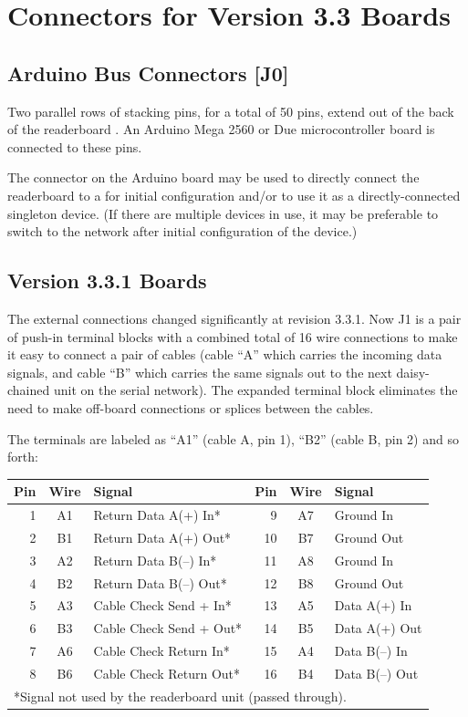 \section{Connectors for Version 3.3 Boards}
\subsection{Arduino Bus Connectors [J0]}
Two parallel rows of stacking pins, for a total of 50 pins, extend out of the back of the readerboard .
An Arduino Mega 2560 or Due microcontroller board is connected to these pins.

The  connector on the Arduino board may be used to directly connect the readerboard to a 
for initial configuration and/or to use it as a directly-connected singleton device. (If there are multiple
devices in use, it may be preferable to switch to the  network after initial configuration of the
device.)

\subsection{Version 3.3.1 Boards}
The external connections changed significantly at revision 3.3.1. Now J1 is a pair of push-in terminal
blocks with a combined total of 16 wire connections to make it easy to connect a pair of  cables
(cable ``A'' which carries the incoming data signals, and cable ``B'' which carries the same signals out to
the next daisy-chained unit on the  serial network). The expanded terminal block eliminates the
need to make off-board connections or splices between the cables.

The terminals are labeled as ``A1'' (cable A, pin 1), ``B2'' (cable B, pin 2) and so forth:
\begin{center}
	\begin{tabular}{rcl|rcl}\toprule
		\bfseries Pin & \bfseries Wire & \bfseries Signal &
		\bfseries Pin & \bfseries Wire & \bfseries Signal \\\midrule
		1&A1&Return Data A(+) In*   & 9&A7&Ground In\\
		2&B1&Return Data A(+) Out*  &10&B7&Ground Out\\
		3&A2&Return Data B(--) In*  &11&A8&Ground In\\
		4&B2&Return Data B(--) Out* &12&B8&Ground Out\\
		5&A3&Cable Check Send + In* &13&A5&Data A(+) In\\
		6&B3&Cable Check Send + Out*&14&B5&Data A(+) Out\\
		7&A6&Cable Check Return In* &15&A4&Data B(--) In\\
		8&B6&Cable Check Return Out*&16&B4&Data B(--) Out\\
		\bottomrule
		\multicolumn{6}{l}{*Signal not used by the readerboard unit (passed through).}
	\end{tabular}
\end{center}

